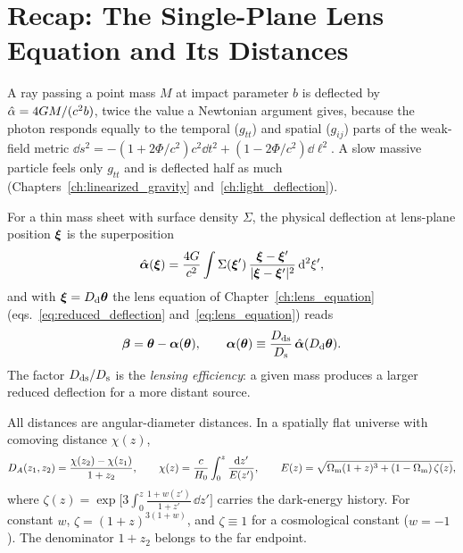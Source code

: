 \section{Recap: The Single-Plane Lens Equation and Its Distances}
\label{sec:mp_recap}

\begin{aside}
A ray passing a point mass $M$ at impact parameter $b$ is deflected by
$\hat{\alpha} = 4GM/(c^2 b)$, twice the value a Newtonian argument gives,
because the photon responds equally to the temporal ($g_{tt}$) and
spatial ($g_{ij}$) parts of the weak-field metric
$\dd s^2 = -(1+2\Phi/c^2)c^2\dd t^2 + (1-2\Phi/c^2)\dd\ell^2$.  A slow
massive particle feels only $g_{tt}$ and is deflected half as much
(Chapters~\ref{ch:linearized_gravity} and~\ref{ch:light_deflection}).
\end{aside}

For a thin mass sheet with surface density $\Sigma$, the physical
deflection at lens-plane position $\boldsymbol{\xi}$ is the superposition
\begin{equation}
    \hat{\boldsymbol{\alpha}}(\boldsymbol{\xi}) = \frac{4G}{c^2}\int \Sigma(\boldsymbol{\xi}')\,
    \frac{\boldsymbol{\xi}-\boldsymbol{\xi}'}{|\boldsymbol{\xi}-\boldsymbol{\xi}'|^2}\,\dd^2\xi' ,
    \label{eq:mp_alphahat}
\end{equation}
and with $\boldsymbol{\xi}=D_{\mathrm{d}}\boldsymbol{\theta}$ the lens equation of
Chapter~\ref{ch:lens_equation} (eqs.~\eqref{eq:reduced_deflection}
and~\eqref{eq:lens_equation}) reads
\begin{equation}
    \boldsymbol{\beta} = \boldsymbol{\theta} - \boldsymbol{\alpha}(\boldsymbol{\theta}),\qquad
    \boldsymbol{\alpha}(\boldsymbol{\theta}) \equiv \frac{D_{\mathrm{ds}}}{D_{\mathrm{s}}}\,\hat{\boldsymbol{\alpha}}(D_{\mathrm{d}}\boldsymbol{\theta}).
    \label{eq:mp_singleplane}
\end{equation}
The factor $D_{\mathrm{ds}}/D_{\mathrm{s}}$ is the \emph{lensing efficiency}: a given mass
produces a larger reduced deflection for a more distant source.

All distances are angular-diameter distances.  In a spatially flat
universe with comoving distance $\chi(z)$,
\begin{equation}
    D_A(z_1,z_2) = \frac{\chi(z_2)-\chi(z_1)}{1+z_2},\qquad
    \chi(z)=\frac{c}{H_0}\int_0^{z}\frac{\dd z'}{E(z')},\qquad
    E(z)=\sqrt{\Omega_{\mathrm{m}}(1+z)^3+(1-\Omega_{\mathrm{m}})\,\zeta(z)},
    \label{eq:mp_DA}
\end{equation}
where $\zeta(z)=\exp\!\big[3\!\int_0^z \frac{1+w(z')}{1+z'}\,\dd z'\big]$
carries the dark-energy history.  For constant $w$,
$\zeta=(1+z)^{3(1+w)}$, and $\zeta\equiv1$ for a cosmological constant
($w=-1$).  The denominator $1+z_2$ belongs to the far endpoint.

